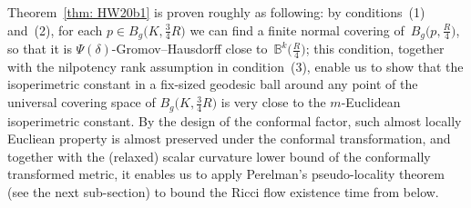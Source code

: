 \documentclass[10pt,a4paper]{amsart}
\numberwithin{equation}{section}
\begin{document}
Theorem~\ref{thm: HW20b1} is proven roughly as following: by
conditions~(1) and~(2), for each $p\in B_g\big(K,\frac{3}{4}R\big)$ we can find a finite
normal covering of~$B_g\big(p,\frac{R}{4}\big)$, so that it is
$\Psi(\delta)$-Gromov--Hausdorff close to~$\mathbb{B}^k\big(\frac{R}{4}\big)$; this
condition, together with the nilpotency rank assumption in condition~(3),
enable us to show that the isoperimetric constant in a fix-sized geodesic ball
around any point of the universal covering space of $B_g\big(K,\frac{3}{4}R\big)$ is
very close to the $m$-Euclidean isoperimetric constant. By the design of the
conformal factor, such almost locally Eucliean property is almost
preserved under the conformal transformation, and together with the (relaxed)
scalar curvature lower bound of the conformally transformed metric, it enables
us to apply Perelman's pseudo-locality theorem (see the next sub-section) to bound
the Ricci flow existence time from below.
\end{document}
